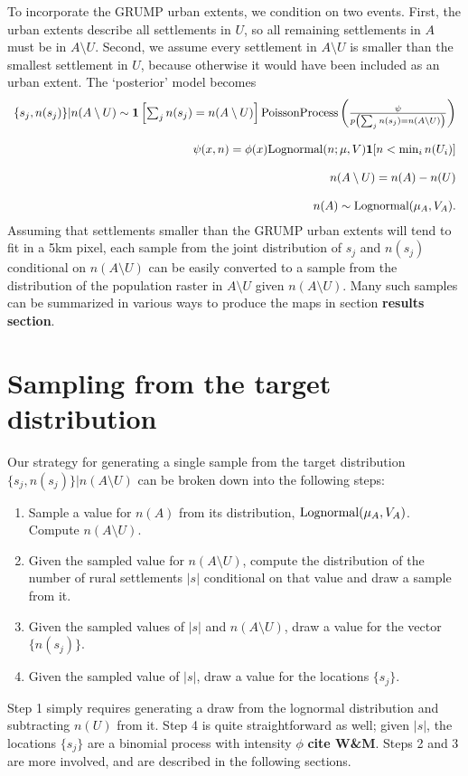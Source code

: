 \documentclass[a4paper]{article}
\begin{document}
To incorporate the GRUMP urban extents, we condition on two events. First, the urban extents describe all settlements in $U$, so all remaining settlements in $A$ must be in $A\setminus U$. Second, we assume every settlement in $A\setminus U$ is smaller than the smallest settlement in $U$, because otherwise it would have been included as an urban extent. The `posterior' model becomes
\begin{equation}
	\label{eq:cond_on_grump} 
	\begin{array}{r}
		\{s_j,n(s_j)\}|n(A\setminus U) \sim \mathbf{1}\left[\sum_j n(s_j)=n(A\setminus U)\right]\textup{PoissonProcess}
		\left(\frac{\psi}{p\left(\sum_j n(s_j)=n(A\setminus U)\right)}\right)\\\\
		\psi(x,n)=\phi(x)\textup{Lognormal}(n;\mu,V)\mathbf{1}[n<\min_in(U_i)]\\\\
		n(A\setminus U) = n(A) - n(U)\\\\
		n(A) \sim \textup{Lognormal}(\mu_A, V_A).
	\end{array}
\end{equation}
Assuming that settlements smaller than the GRUMP urban extents will tend to fit in a 5km pixel, each sample from the joint distribution of $s_j$ and $n(s_j)$ conditional on $n(A\setminus U)$ can be easily converted to a sample from the distribution of the population raster in $A\setminus U$ given $n(A\setminus U)$. Many such samples can be summarized in various ways to produce the maps in section \textbf{results section}.

\section{Sampling from the target distribution}
Our strategy for generating a single sample from the target distribution $\{s_j,n(s_j)\}|n(A\setminus U)$ can be broken down into the following steps:
\begin{enumerate}
	\item Sample a value for $n(A)$ from its distribution, $\textup{Lognormal}(\mu_A, V_A)$. Compute $n(A\setminus U)$.
	\item Given the sampled value for $n(A\setminus U)$, compute the distribution of the number of rural settlements $|s|$ conditional on that value and draw a sample from it.
	\item Given the sampled values of $|s|$ and $n(A\setminus U)$, draw a value for the vector $\{n(s_j)\}$.
	\item Given the sampled value of $|s|$, draw a value for the locations $\{s_j\}$.
\end{enumerate}
Step 1 simply requires generating a draw from the lognormal distribution and subtracting $n(U)$ from it. Step 4 is quite straightforward as well; given $|s|$, the locations $\{s_j\}$ are a binomial process with intensity $\phi$ \textbf{cite W\&M}. Steps 2 and 3 are more involved, and are described in the following sections.
\end{document}
